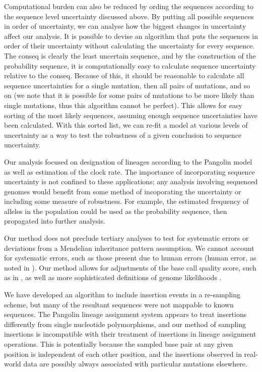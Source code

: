 \documentclass[10pt]{article}
\begin{document}
Computational burden can also be reduced by ording the sequences according to the sequence level uncertainty discussed above.
By putting all possible sequences in order of uncertainty, we can analyse how the biggest changes in uncertainty affect our analysis.
It is possible to devise an algorithm that puts the sequences in order of their uncertainty without calculating the uncertainty for every sequence.
The conseq is clearly the least uncertain sequence, and by the construction of the probability sequence, it is computationally easy to calculate sequence uncertainty relative to the conseq.
Because of this, it should be reasonable to calculate all sequence uncertainties for a single mutation, then all pairs of mutations, and so on (we note that it is possible for some pairs of mutations to be more likely than single mutations, thus this algorithm cannot be perfect).
This allows for easy sorting of the most likely sequences, assuming enough sequence uncertainties have been calculated.
With this sorted list, we can re-fit a model at various levels of uncertainty as a way to test the robustness of a given conclusion to sequence uncertainty.

Our analysis focused on designation of lineages according to the Pangolin model as well as estimation of the clock rate.
The importance of incorporating sequence uncertainty is not confined to these applications; any analysis involving sequenced genomes would benefit from some method of incoporating the uncertainty or including some measure of robustness.
For example, the estimated frequency of alleles in the population could be used as the probability sequence, then propagated into further analysis.

Our method does not preclude tertiary analyses to test for systematic errors or deviations from a Mendelian inheritance pattern assumption.
We cannot account for systematic errors, such as those present due to human errors (\eg human error, as noted in \citet{IssuesSARSCoV2Sequencing2020}). 
Our method allows for adjustments of the base call quality score, such as in \citet{brockmanQualityScoresSNP2008}, as well as more sophisticated definitions of genome likelihoods \citep[\eg]{liAdjustQualityScores2004, depristoFrameworkVariationDiscovery2011, liSNPDetectionMassively2009}.

We have developed an algorithm to include insertion events in a re-sampling scheme, but many of the resultant sequences were not mappable to known sequences.
The Pangolin lineage assignment system appears to treat insertions differently from single nucleotide polymorphisms, and our method of sampling insertions is incompatible with their treatment of insertions in lineage assignment operations.
This is potentially because the sampled base pair at any given position is independent of each other position, and the insertions observed in real-world data are possibly always associated with particular mutations elsewhere.
\end{document}

